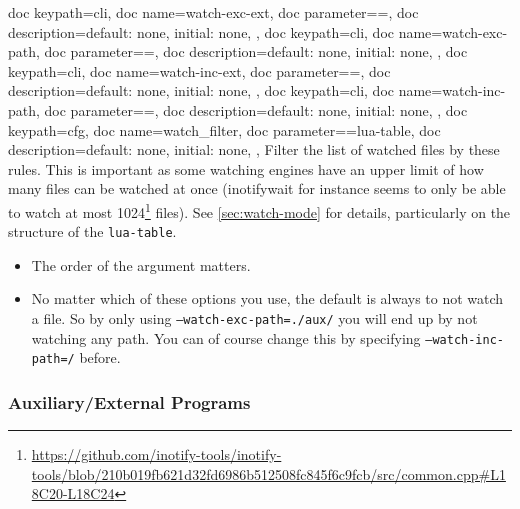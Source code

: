 \documentclass[a4paper, 11pt]{scrartcl}
\begin{document}
\begin{docKeys}[
	]{
		{
			doc keypath=cli,
			doc name=watch-exc-ext,
			doc parameter={=},
			doc description={default: none, initial: none},
		},
		{
			doc keypath=cli,
			doc name=watch-exc-path,
			doc parameter={=},
			doc description={default: none, initial: none},
		},
		{
			doc keypath=cli,
			doc name=watch-inc-ext,
			doc parameter={=},
			doc description={default: none, initial: none},
		},
		{
			doc keypath=cli,
			doc name=watch-inc-path,
			doc parameter={=},
			doc description={default: none, initial: none},
		},
		{
			doc keypath=cfg,
			doc name=watch_filter,
			doc parameter={=lua-table},
			doc description={default: none, initial: none},
		},
	}
	Filter the list of watched files by these rules.
	This is important as some watching engines have an upper limit of how many files can be watched at once (inotifywait for instance seems to only be able to watch at most 1024\footnote{\url{https://github.com/inotify-tools/inotify-tools/blob/210b019fb621d32fd6986b512508fc845f6c9fcb/src/common.cpp\#L18C20-L18C24}} files).
	See \cref{sec:watch-mode} for details, particularly on the structure of the \texttt{lua-table}.

	\begin{itemize}
		\item[Note:] The order of the argument matters.
		\item[Note:] No matter which of these options you use, the default is always to not watch a file.
			So by only using \texttt{--watch-exc-path=./aux/} you will end up by not watching any path.
			You can of course change this by specifying \texttt{--watch-inc-path=/} before.
	\end{itemize}
\end{docKeys}

\subsubsection{Auxiliary/External Programs}
\end{document}
